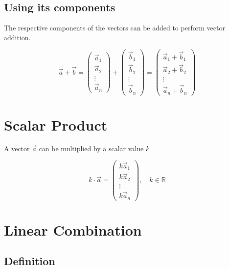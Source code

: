 \documentclass{article}
\begin{document}
\subsection{Using its components}

The respective components of the vectors can be added to perform vector addition.

\[
    \vec{a} + \vec{b} =
    \begin{pmatrix}
        \vec{a}_1 \\
        \vec{a}_2 \\
        \vdots \\
        \vec{a}_n
    \end{pmatrix}
    +
    \begin{pmatrix}
        \vec{b}_1 \\
        \vec{b}_2 \\
        \vdots \\
        \vec{b}_n
    \end{pmatrix}
    =
    \begin{pmatrix}
        \vec{a}_1 + \vec{b}_1 \\
        \vec{a}_2 + \vec{b}_2\\
        \vdots \\
        \vec{a}_n + \vec{b}_n
    \end{pmatrix}
\]

\pagebreak

\section{Scalar Product}

A vector \(\vec{a}\) can be multiplied by a scalar value \(k\)

\[
    k\cdot\vec{a} =
    \begin{pmatrix}
        k \vec{a}_1 \\
        k \vec{a}_2 \\
        \vdots \\
        k \vec{a}_n
    \end{pmatrix},
    \quad k\in\mathbb{R}
\]


\section{Linear Combination}

%
%
%
%
%
%

\subsection{Definition}
\end{document}
